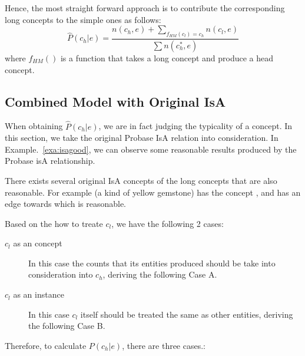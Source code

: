 Hence, the most straight forward approach is to contribute the corresponding long concepts to the simple ones as follows:
$$\hat{P}(c_h|e)=\frac{n(c_h,e)+\sum_{ f_{HM}(c_l)=c_h} n(c_l,e)}{ \sum n(c_h^*,e)} $$
where $f_{HM}()$ is a function that takes a long concept and produce a head concept.

\subsection{Combined Model with Original IsA}
When obtaining $\hat{P}(c_h|e)$, we are in fact judging the typicality of a concept.
In this section, we take the original Probase IsA relation into consideration. In Example.~\ref{exa:isagood}, we can observe some reasonable results produced by the Probase isA relationship.

\begin{example}
\label{exa:isagood}
  There exists several original IsA concepts of the long concepts that are also reasonable. For example (a kind of yellow gemstone) has the concept , and  has an edge towards  which is reasonable.
\end{example}

Based on the how to treate $c_l$, we have the following 2 cases:

\begin{description}
  \item[$c_l$ as an concept] In this case the counts that its entities produced should be take into consideration into $c_h$, deriving the following Case A.
  \item[$c_l$ as an instance] In this case $c_l$ itself should be treated the same as other entities, deriving the following Case B.
\end{description}


Therefore, to calculate  $P({c_h}|e)$, there are three cases.:


